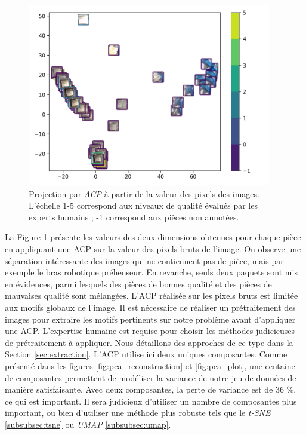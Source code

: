 \begin{figure}[hbtp]
    \centering
    \includegraphics[width=0.95\textwidth,height=\textheight,keepaspectratio]{../Chap3/Figures/visualize_PCA_pixel_space.png}
    \caption{Projection par \textit{ACP} à partir de la valeur des pixels des images. L'échelle 1-5 correspond aux niveaux de qualité évalués par les experts humains ; -1 correspond aux pièces non annotées.}
    \label{fig:ACP}
\end{figure}

La Figure \ref{fig:ACP} présente les valeurs des deux dimensions obtenues pour chaque pièce en appliquant une ACP sur la valeur des pixels bruts de l'image.
On observe une séparation intéressante des images qui ne contiennent pas de pièce, mais par exemple le bras robotique préhenseur.
En revanche, seuls deux paquets sont mis en évidences, parmi lesquels des pièces de bonnes qualité et des pièces de mauvaises qualité sont mélangées.
L'ACP réalisée sur les pixels bruts est limitée aux motifs globaux de l'image.
Il est nécessaire de réaliser un prétraitement des images pour extraire les motifs pertinents sur notre problème avant d'appliquer une ACP.
L'expertise humaine est requise pour choisir les méthodes judicieuses de prétraitement à appliquer.
Nous détaillons des approches de ce type dans la Section \ref{sec:extraction}.
L'ACP utilise ici deux uniques composantes.
Comme présenté dans les figures \ref{fig:pca_reconstruction} et \ref{fig:pca_plot}, une centaine de composantes permettent de modéliser la variance de notre jeu de données de manière satisfaisante.
Avec deux composantes, la perte de variance est de 36 \%, ce qui est important.
Il sera judicieux d'utiliser un nombre de composantes plus important, ou bien d'utiliser une méthode plus robuste tels que le \textit{t-SNE} \ref{subsubsec:tsne} ou \textit{UMAP} \ref{subsubsec:umap}.

